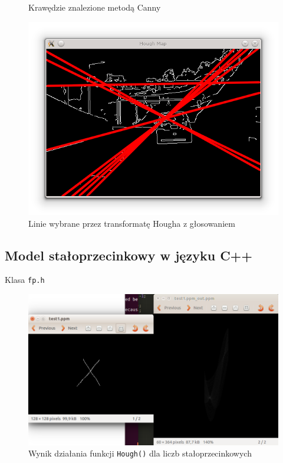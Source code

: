\begin{figure}[!htb]
  \caption{Krawędzie znalezione metodą Canny}\label{fig:awesome_image2}
\endminipage\hfill
{}%
  \includegraphics[width=\linewidth]{img/hough_screen.png}
  \caption{Linie wybrane przez transformatę Hougha z głosowaniem}\label{fig:awesome_image3}
\endminipage
\end{figure}

\blindtext

%

\newpage
\subsection{Model stałoprzecinkowy w języku C++}

Klasa \texttt{fp.h}

\begin{figure}[!htb]
\centering
\includegraphics[scale=0.75]{img/fixed.png}
\caption{Wynik działania funkcji \texttt{Hough()} dla liczb stałoprzecinkowych}
\label{rys:fp}
\end{figure}

